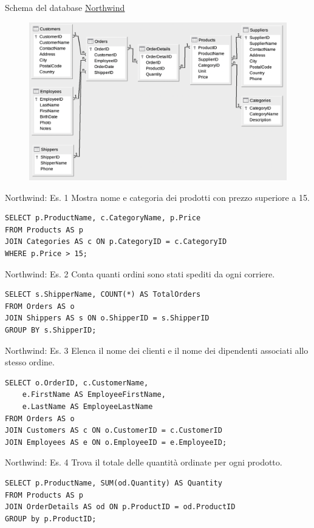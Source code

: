\begin{frame}[fragile]{Schema del database \href{https://en.wikiversity.org/wiki/Database_Examples/Northwind/MySQL}{\underline{Northwind}}}
\begin{figure}
    \centering
    \includegraphics[width=.7\textwidth]{img/db-northwind.png}
\end{figure}
\end{frame}
%
\begin{frame}[fragile]{Northwind: Es. 1}
Mostra nome e categoria dei prodotti con prezzo superiore a 15.
\pause
\begin{lstlisting}
SELECT p.ProductName, c.CategoryName, p.Price
FROM Products AS p
JOIN Categories AS c ON p.CategoryID = c.CategoryID
WHERE p.Price > 15;
\end{lstlisting}
\end{frame}
%
\begin{frame}[fragile]{Northwind: Es. 2}
Conta quanti ordini sono stati spediti da ogni corriere.
\pause
\begin{lstlisting}
SELECT s.ShipperName, COUNT(*) AS TotalOrders
FROM Orders AS o
JOIN Shippers AS s ON o.ShipperID = s.ShipperID
GROUP BY s.ShipperID;
\end{lstlisting}
\end{frame}
%
\begin{frame}[fragile]{Northwind: Es. 3}
Elenca il nome dei clienti e il nome dei dipendenti associati allo stesso ordine.
\pause
\begin{lstlisting}
SELECT o.OrderID, c.CustomerName, 
    e.FirstName AS EmployeeFirstName, 
	e.LastName AS EmployeeLastName
FROM Orders AS o 
JOIN Customers AS c ON o.CustomerID = c.CustomerID
JOIN Employees AS e ON o.EmployeeID = e.EmployeeID;
\end{lstlisting}
\end{frame}
%
\begin{frame}[fragile]{Northwind: Es. 4}
Trova il totale delle quantit\`a ordinate per ogni prodotto.
\pause
\begin{lstlisting}
SELECT p.ProductName, SUM(od.Quantity) AS Quantity
FROM Products AS p
JOIN OrderDetails AS od ON p.ProductID = od.ProductID
GROUP by p.ProductID;
\end{lstlisting}
\end{frame}
